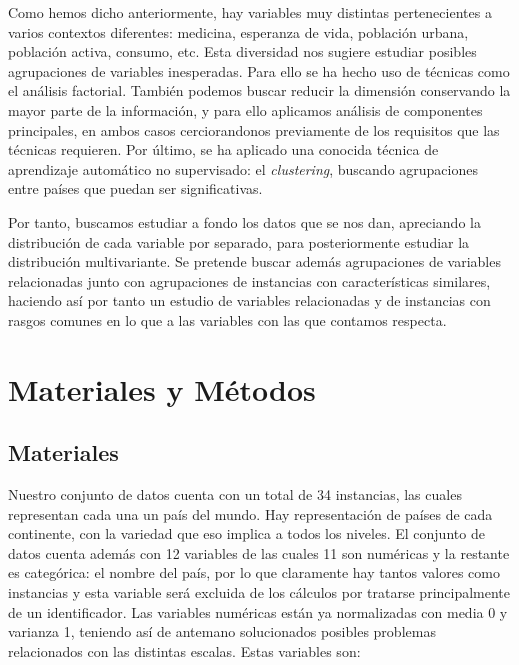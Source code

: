 \documentclass[letterpaper,11pt]{article}
\begin{document}
Como hemos dicho anteriormente, hay variables muy distintas pertenecientes a varios contextos diferentes: medicina, esperanza de vida, población urbana, población activa, consumo, etc. Esta diversidad nos sugiere estudiar posibles agrupaciones de variables inesperadas. Para ello se ha hecho uso de técnicas como el análisis factorial. También podemos buscar reducir la dimensión conservando la mayor parte de la información, y para ello aplicamos análisis de componentes principales, en ambos casos cerciorandonos previamente de los requisitos que las técnicas requieren. Por último, se ha aplicado una conocida técnica de aprendizaje automático no supervisado: el \textit{clustering}, buscando agrupaciones entre países que puedan ser significativas.

Por tanto, buscamos estudiar a fondo los datos que se nos dan, apreciando la distribución de cada variable por separado, para posteriormente estudiar la distribución multivariante. Se pretende buscar además agrupaciones de variables relacionadas junto con agrupaciones de instancias con características similares, haciendo así por tanto un estudio de variables relacionadas y de instancias con rasgos comunes en lo que a las variables con las que contamos respecta.

\section{Materiales y Métodos}

\subsection{Materiales}

Nuestro conjunto de datos cuenta con un total de 34 instancias, las cuales representan cada una un país del mundo. Hay representación de países de cada continente, con la variedad que eso implica a todos los niveles. El conjunto de datos cuenta además con 12 variables de las cuales 11 son numéricas y la restante es categórica: el nombre del país, por lo que claramente hay tantos valores como instancias y esta variable será excluida de los cálculos por tratarse principalmente de un identificador. Las variables numéricas están ya normalizadas con media 0 y varianza 1, teniendo así de antemano solucionados posibles problemas relacionados con las distintas escalas. Estas variables son:
\end{document}
